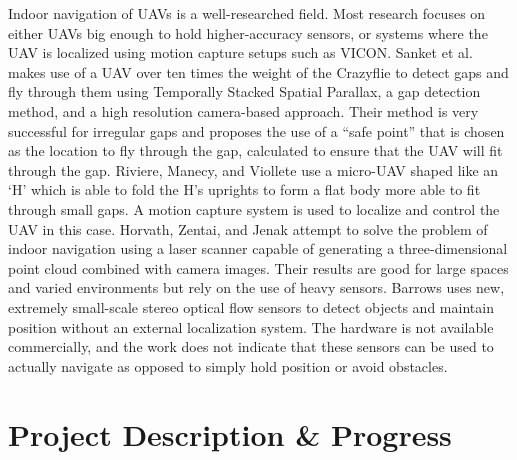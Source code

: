 \documentclass[12pt]{article}
\begin{document}
Indoor navigation of UAVs is a well-researched field. Most research focuses on either UAVs big enough to hold higher-accuracy sensors, or systems where the UAV is localized using motion capture setups such as VICON. Sanket et al. \cite{gapflyt} makes use of a UAV over ten times the weight of the Crazyflie to detect gaps and fly through them using Temporally Stacked Spatial Parallax, a gap detection method, and a high resolution camera-based approach. Their method is very successful for irregular gaps and proposes the use of a ``safe point'' that is chosen as the location to fly through the gap, calculated to ensure that the UAV will fit through the gap. Riviere, Manecy, and Viollete\cite{Folding} use a micro-UAV shaped like an `H' which is able to fold the H's uprights to form a flat body more able to fit through small gaps. A motion capture system is used to localize and control the UAV in this case. Horvath, Zentai, and Jenak\cite{PCNav} attempt to solve the problem of indoor navigation using a laser scanner capable of generating a three-dimensional point cloud combined with camera images. Their results are good for large spaces and varied environments but rely on the use of heavy sensors. Barrows\cite{crazyflie_centeye} uses new, extremely small-scale stereo optical flow sensors to detect objects and maintain position without an external localization system. The hardware is not available commercially, and the work does not indicate that these sensors can be used to actually navigate as opposed to simply hold position or avoid obstacles. 

\section{Project Description \& Progress}
\end{document}
